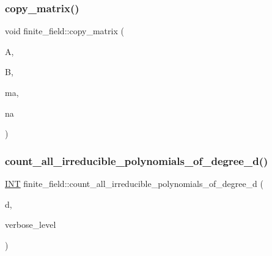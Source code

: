 \subsubsection{\texorpdfstring{copy\+\_\+matrix()}{copy\_matrix()}}
{\footnotesize\ttfamily void finite\+\_\+field\+::copy\+\_\+matrix (\begin{DoxyParamCaption}\item[{\mbox{\hyperlink{galois_8h_a09fddde158a3a20bd2dcadb609de11dc}{I\+NT}} $\ast$}]{A,  }\item[{\mbox{\hyperlink{galois_8h_a09fddde158a3a20bd2dcadb609de11dc}{I\+NT}} $\ast$}]{B,  }\item[{\mbox{\hyperlink{galois_8h_a09fddde158a3a20bd2dcadb609de11dc}{I\+NT}}}]{ma,  }\item[{\mbox{\hyperlink{galois_8h_a09fddde158a3a20bd2dcadb609de11dc}{I\+NT}}}]{na }\end{DoxyParamCaption})}

\mbox{\label{classfinite__field_a0d97f37c55f39f80759fa8e2cfe18266}} 
\subsubsection{\texorpdfstring{count\+\_\+all\+\_\+irreducible\+\_\+polynomials\+\_\+of\+\_\+degree\+\_\+d()}{count\_all\_irreducible\_polynomials\_of\_degree\_d()}}
{\footnotesize\ttfamily \mbox{\hyperlink{galois_8h_a09fddde158a3a20bd2dcadb609de11dc}{I\+NT}} finite\+\_\+field\+::count\+\_\+all\+\_\+irreducible\+\_\+polynomials\+\_\+of\+\_\+degree\+\_\+d (\begin{DoxyParamCaption}\item[{\mbox{\hyperlink{galois_8h_a09fddde158a3a20bd2dcadb609de11dc}{I\+NT}}}]{d,  }\item[{\mbox{\hyperlink{galois_8h_a09fddde158a3a20bd2dcadb609de11dc}{I\+NT}}}]{verbose\+\_\+level }\end{DoxyParamCaption})}

\mbox{\label{classfinite__field_a33e052044b18cf8dc31e6fbffbb1f0db}} 
